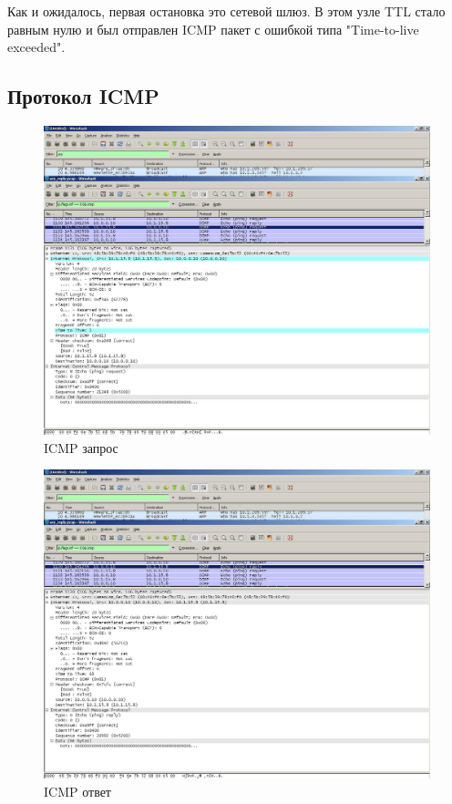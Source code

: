 \documentclass[14pt,a4paper,report]{report}
\begin{document}
Как и ожидалось, первая остановка это сетевой шлюз. В этом узле TTL стало равным нулю и был отправлен ICMP пакет с ошибкой типа "Time-to-live exceeded".

\clearpage

\subsection{Протокол ICMP}


\begin{figure}[h!]
	\centering
	\includegraphics[scale = 0.4]{images/icmp_req.JPG}
	\caption{ICMP запрос}
	\label{image:9}
\end{figure}

\begin{figure}[h!]
	\centering
	\includegraphics[scale = 0.4]{images/icmp_rep.JPG}
	\caption{ICMP ответ}
	\label{image:8}
\end{figure}
\end{document}
